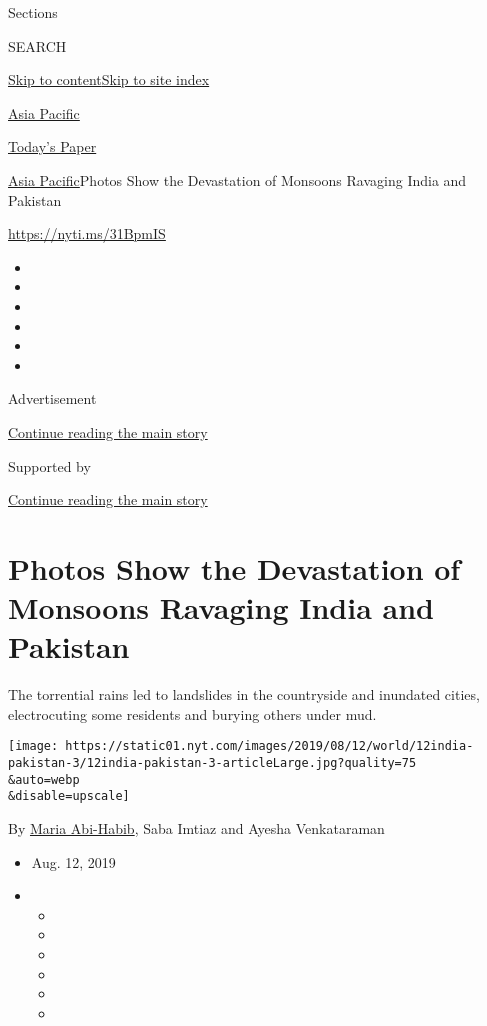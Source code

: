 Sections

SEARCH

\protect\hyperlink{site-content}{Skip to
content}\protect\hyperlink{site-index}{Skip to site index}

\href{https://www.nytimes.com/section/world/asia}{Asia Pacific}

\href{https://myaccount.nytimes.com/auth/login?response_type=cookie\&client_id=vi}{}

\href{https://www.nytimes.com/section/todayspaper}{Today's Paper}

\href{/section/world/asia}{Asia Pacific}\textbar{}Photos Show the
Devastation of Monsoons Ravaging India and Pakistan

\url{https://nyti.ms/31BpmIS}

\begin{itemize}
\item
\item
\item
\item
\item
\item
\end{itemize}

Advertisement

\protect\hyperlink{after-top}{Continue reading the main story}

Supported by

\protect\hyperlink{after-sponsor}{Continue reading the main story}

\hypertarget{photos-show-the-devastation-of-monsoons-ravaging-india-and-pakistan}{%
\section{Photos Show the Devastation of Monsoons Ravaging India and
Pakistan}\label{photos-show-the-devastation-of-monsoons-ravaging-india-and-pakistan}}

The torrential rains led to landslides in the countryside and inundated
cities, electrocuting some residents and burying others under mud.

\texttt{[image: https://static01.nyt.com/images/2019/08/12/world/12india-pakistan-3/12india-pakistan-3-articleLarge.jpg?quality=75\\\&auto=webp\\\&disable=upscale]}

By \href{https://www.nytimes.com/by/maria-abi-habib}{Maria Abi-Habib},
Saba Imtiaz and Ayesha Venkataraman

\begin{itemize}
\item
  Aug. 12, 2019
\item
  \begin{itemize}
  \item
  \item
  \item
  \item
  \item
  \item
  \end{itemize}
\end{itemize}

